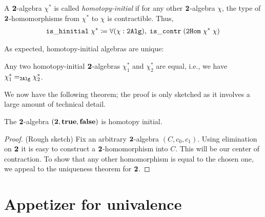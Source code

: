 \begin{defn}
A $\two$-algebra $\chi^*$ is called \emph{homotopy-initial} if for any other $\two$-algebra $\chi$, the type of $\two$-homomorphisms from $\chi^*$ to $\chi$ is contractible. Thus,
\begin{align*}
\mathtt{is\_hinitial \; \chi^* \defeq \fall{\chi : 2Alg} \; is\_contr \; (2Hom \; \chi^*\; \chi)}
\end{align*}
\end{defn}

As expected, homotopy-initial algebras are unique:
\begin{thm}
Any two homotopy-initial $\two$-algebras $\chi^*_1$ and $\chi^*_2$ are equal, i.e., we have $\id[\mathtt{2Alg}]{\chi_1^*}{\chi_2^*}$.
\end{thm}


We now have the following theorem; the proof is only sketched as it involves a large amount of technical detail.
\begin{thm}
The $\two$-algebra $(\two, \true, \false)$ is homotopy initial.
\end{thm}
\begin{proof}
(Rough sketch) Fix an arbitrary $\two$-algebra $(C,c_0,c_1)$. Using elimination on $\two$ it is easy to construct a $\two$-homomorphism into $C$. This will be our
center of contraction. To show that any other homomorphism is equal to the chosen one, we appeal to the uniqueness theorem for $\two$.
\end{proof}


\section{Appetizer for univalence}

\newcommand{\natp}{\ensuremath{\mathbf{N'}}\xspace}
\newcommand{\zp}{\ensuremath{0'}\xspace}
\newcommand{\Sp}{\ensuremath{\mathbf{s'}}\xspace}
\newcommand{\dblp}{\ensuremath{\mathbf{double'}}}

